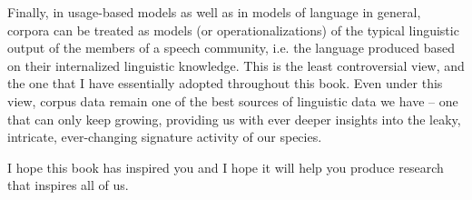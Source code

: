 Finally, in usage\hyp{}based models as well as in models of language in general, corpora can be treated as models (or operationalizations)  of the typical linguistic output of the members of a speech community, i.e. the language produced based on their internalized linguistic knowledge. This is the least controversial view, and the one that I have essentially adopted throughout this book. Even under this view, corpus data remain one of the best sources of linguistic data we have -- one that can only keep growing, providing us with ever deeper insights into the leaky, intricate, ever\hyp{}changing signature activity of our species.

I hope this book has inspired you and I hope it will help you produce research that inspires all of us.
